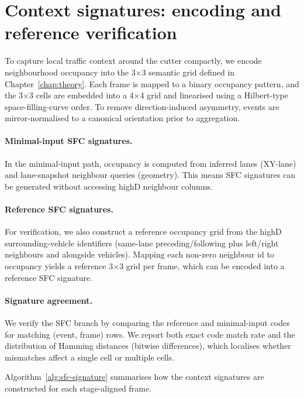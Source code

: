 \documentclass[12pt,a4paper,twoside,openright]{report}
\begin{document}
    \section{Context signatures: encoding and reference verification}
    To capture local traffic context around the cutter compactly, we encode neighbourhood occupancy into the 3$\times$3 semantic grid defined in Chapter~\ref{chap:theory}. Each frame is mapped to a binary occupancy pattern, and the 3$\times$3 cells are embedded into a 4$\times$4 grid and linearised using a Hilbert-type space-filling-curve order. To remove direction-induced asymmetry, events are mirror-normalised to a canonical orientation prior to aggregation.

    \paragraph{Minimal-input SFC signatures.}
    In the minimal-input path, occupancy is computed from inferred lanes (XY-lane) and lane-snapshot neighbour queries (geometry). This means SFC signatures can be generated without accessing highD neighbour columns.

    \paragraph{Reference SFC signatures.}
    For verification, we also construct a reference occupancy grid from the highD surrounding-vehicle identifiers (same-lane preceding/following plus left/right neighbours and alongside vehicles). Mapping each non-zero neighbour id to occupancy yields a reference 3$\times$3 grid per frame, which can be encoded into a reference SFC signature.

    \paragraph{Signature agreement.}
    We verify the SFC branch by comparing the reference and minimal-input codes for matching (event, frame) rows. We report both exact code match rate and the distribution of Hamming distances (bitwise differences), which localises whether mismatches affect a single cell or multiple cells.


    Algorithm~\ref{alg:sfc-signature} summarises how the context signatures are constructed for each stage-aligned frame.
\end{document}
